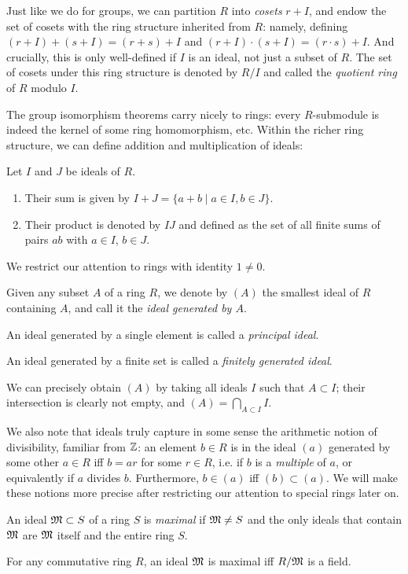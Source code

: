 Just like we do for groups, we can partition $R$ into \emph{cosets} $r+I$, and endow the set of cosets with the ring structure inherited from $R$: namely, defining $(r+I)+(s+I)=(r+s)+I$ and $(r+I)\cdot (s+I) = (r\cdot s) + I$. And crucially, this is only well-defined if $I$ is an ideal, not just a subset of $R$. The set of cosets under this ring structure is denoted by $R/I$ and called the \emph{quotient ring} of $R$ modulo $I$.

The group isomorphism theorems carry nicely to rings: every $R$-submodule is indeed the kernel of some ring homomorphism, etc. Within the richer ring structure, we can define addition and multiplication of ideals:

\begin{defn}
	Let $I$ and $J$ be ideals of $R$.
	\begin{enumerate}[(1)]
		\item Their sum is given by $I+J=\{a+b \mid a\in I, b\in J\}$.
		\item Their product is denoted by $IJ$ and defined as the set of all finite sums of pairs $ab$ with $a\in I$, $b\in J$.
	\end{enumerate}
\end{defn}

We restrict our attention to rings with identity $1\neq 0$.

\begin{defn}
	Given any subset $A$ of a ring $R$, we denote by $(A)$ the smallest ideal of $R$ containing $A$, and call it the \emph{ideal generated by $A$}.

	An ideal generated by a single element is called a \emph{principal ideal}.

	An ideal generated by a finite set is called a \emph{finitely generated ideal}.
\end{defn}

We can precisely obtain $(A)$ by taking all ideals $I$ such that $A\subset I$; their intersection is clearly not empty, and $(A)=\bigcap_{A\subset I} I$.

We also note that ideals truly capture in some sense the arithmetic notion of divisibility, familiar from $\mathbb{Z}$: an element $b\in R$ is in the ideal $(a)$ generated by some other $a\in R$ iff $b=ar$ for some $r\in R$, i.e. if $b$ is a \emph{multiple} of $a$, or equivalently if $a$ divides $b$. Furthermore, $b\in(a)$ iff $(b)\subset(a)$. We will make these notions more precise after restricting our attention to special rings later on.

\begin{defn}
	An ideal $\mathfrak{M}\subset S$ of a ring $S$ is \emph{maximal} if $\mathfrak{M}\neq S$ and the only ideals that contain $\mathfrak{M}$ are $\mathfrak{M}$ itself and the entire ring $S$.
\end{defn}

\begin{prop}
	For any commutative ring $R$, an ideal $\mathfrak{M}$ is maximal iff $R/\mathfrak{M}$ is a field.
\end{prop}





